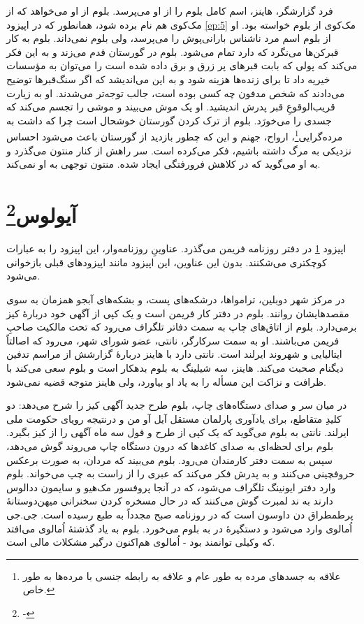 \documentclass[12pt]{book}
\begin{document}
    فرد گزارشگر، هاینز، اسم کامل بلوم را از او می‌پرسد. بلوم از او می‌خواهد که از مک‌کوی هم نام برده شود، همانطور که در اپیزود \ref{ep:5} مک‌کوی از بلوم خواسته بود. او از بلوم اسم مرد ناشناس بارانی‌پوش را می‌پرسد، ولی بلوم نمی‌داند. بلوم به کار قبرکن‌ها می‌نگرد که دارد تمام می‌شود. بلوم در گورستان قدم می‌زند و به این فکر می‌کند که پولی که بابت قبرهای پر زرق و برق داده شده است را می‌توان به مؤسسات خیریه داد تا برای زنده‌ها هزینه شود و به این می‌اندیشد که اگر سنگ‌قبرها توضیح می‌دادند که شخص مدفون چه کسی بوده است، جالب توجه‌تر می‌شدند. او به زیارت قریب‌الوقوعِ قبر پدرش اندیشید. او یک موش می‌بیند و موشی را تجسم می‌کند که جسدی را می‌خورَد. بلوم از ترک کردن گورستان خوشحال است چرا که داشت به مرده‌گرایی\footnote{علاقه به جسدهای مرده به طور عام و علاقه به رابطه جنسی با مرده‌ها به طور خاص.}، ارواح، جهنم و این که چطور بازدید از گورستان باعث می‌شود احساس نزدیکی به مرگ داشته باشیم، فکر می‌کرده است. سر راهش از کنار منتون می‌گذرد و به او می‌گوید که در کلاهش فرورفتگی ایجاد شده. منتون توجهی به او نمی‌کند.

    \chapter[آیولوس]{آیولوس\protect\footnote{-}}\label{ep:7}
    اپیزود \ref{ep:7} در دفتر روزنامه فریمن می‌گذرد. عناوینِ روزنامه‌وار، این اپیزود را به عبارات کوچکتری می‌شکنند. بدون این عناوین، این اپیزود مانند اپیزودهای قبلی بازخوانی می‌شود.

    در مرکز شهر دوبلین، ترامواها، درشکه‌های پست، و بشکه‌های آبجو همزمان به سوی مقصدهایشان روانند. بلوم در دفتر کار فریمن است و یک کپی از آگهی خود دربارۀ کیز برمی‌دارد. بلوم از اتاق‌های چاپ به سمت دفاتر تلگراف می‌رود که تحت مالکیت صاحبِ فریمن می‌باشند. او به سمت سرکارگر، نانتی، عضو شورای شهر، می‌رود که اصالتاً ایتالیایی و شهروند ایرلند است. نانتی دارد با هاینز دربارۀ گزارشش از مراسم تدفین دیگنام صحبت می‌کند. هاینز، سه شیلینگ به بلوم بدهکار است و بلوم سعی می‌کند با ظرافت و نزاکت این مسأله را به یاد او بیاورد، ولی هاینز متوجه قضیه نمی‌شود.

    در میان سر و صدای دستگاه‌های چاپ، بلوم طرح جدید آگهی کیز را شرح می‌دهد: دو کلیدِ متقاطع، برای یادآوری پارلمان مستقل آیل آو من و درنتیجه رویای حکومت ملی ایرلند. نانتی به بلوم می‌گوید که یک کپی از طرح و قول سه ماه آگهی را از کیز بگیرد. بلوم برای لحظه‌ای به صدای کاغدها که درون دستگاه چاپ می‌روند گوش می‌دهد، سپس به سمت دفتر کارمندان می‌رود. بلوم می‌بیند که مردان، به صورت برعکس حروفچینی می‌کنند و به پدرش فکر می‌کند که عبری را از راست به چپ می‌خواند. بلوم وارد دفتر ایونینگ تلگراف می‌شود، که در آنجا پروفسور مک‌هیو و سایمون ددالوس دارند به ند لمبرت گوش می‌کنند که در حال مسخره کردن سخنرانی میهن‌دوستانۀ پرطمطراق دن داوسون است که در روزنامه صبح مجدداً به طبع رسیده است. جی.جی اُمالوی وارد می‌شود و دستگیرۀ در به بلوم می‌خورد. بلوم به یاد گذشتۀ اُمالوی می‌افتد که وکیلی توانمند بود - اُمالوی هم‌اکنون درگیر مشکلات مالی است.
\end{document}
